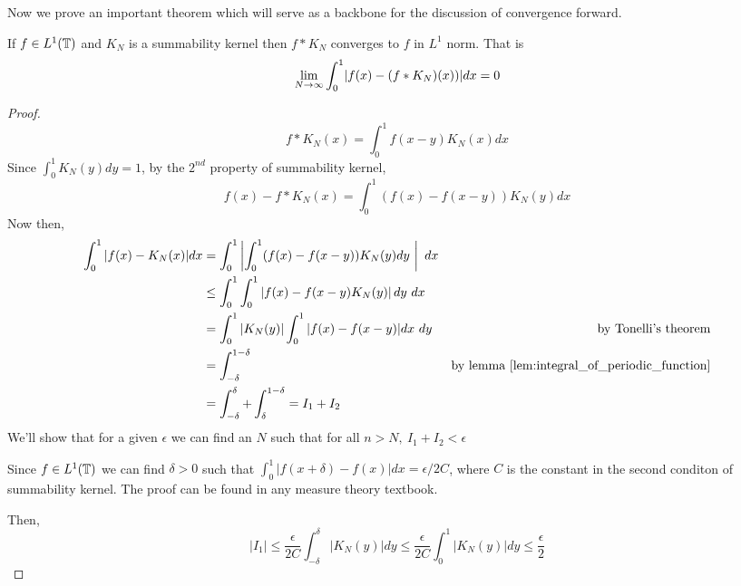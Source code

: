   Now we prove an important theorem which will serve as a backbone for the discussion of convergence forward.
  \begin{theorem}
    \label{thm:L1_convergence_of_summability_kernel}
    If $f\in L^1(\mathbb T)$ and $K_N$ is a summability kernel then $f*K_N$ converges to $f$ in $L^1$ norm. That is
    \begin{displaymath}
      \lim_{N\to \infty} \int_{0}^{1}\lvert f(x) - (f*K_N)(x))\rvert dx = 0
    \end{displaymath}
\end{theorem}
  \begin{proof}
    \begin{displaymath}
      f*K_N(x) = \int_0^1 f(x-y)K_N(x)dx
    \end{displaymath}
    Since $\int_0^1 K_N(y)dy = 1$, by the $2^{nd}$ property of summability kernel,
    \begin{displaymath}
      f(x) - f*K_N(x) = \int_0^1\left(f(x)-f(x-y)\right)K_N(y)dx
    \end{displaymath}
    Now then, 
    \begin{align*}
      \int_0^1 |f(x) - K_N(x)| dx &= \int_0^1 \left| \int_0^1 (f(x) - f(x-y))K_N(y)dy \ \right| \ dx \\
                &\le \int_0^1 \int_0^1 \left| f(x) - f(x-y) K_N(y) \right| dy \ dx \\
                &= \int_0^1 |K_N(y)| \int_0^1 |f(x) - f(x-y)| dx \ dy & \text{by Tonelli's theorem} \\
                &= \int_{-\delta}^{1-\delta} & \text{by lemma } \ref{lem:integral_of_periodic_function} \\
                &= \int_{-\delta}^{\delta} + \int_{\delta}^{1-\delta} = I_1 + I_2\\
    \end{align*}
    We'll show that for a given $\epsilon$ we can find an $N$ such that for all $n>N, \ I_1+I_2 < \epsilon$

    Since $f \in L^1(\mathbb T)$ we can find $\delta >0$ such that $\int_0^1| f(x+\delta) - f(x) | dx = \epsilon / 2C$, where $C$ is the constant in the second conditon of summability kernel. The proof can be found in any measure theory textbook.
    
    Then, 
    \begin{displaymath}
      |I_1| \le \frac{\epsilon}{2C} \int_{-\delta}^{\delta}|K_N(y)|dy \le \frac{\epsilon}{2C} \int_0^1 |K_N(y)| dy \le \frac{\epsilon}{2}
    \end{displaymath}  
    

\end{proof}
